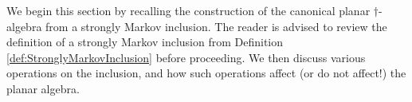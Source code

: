 \documentclass[11pt]{article}
\theoremstyle{plain}
\newtheorem{prop}[thm]{Proposition}
\theoremstyle{definition}
\newtheorem{defn}[thm]{Definition}
\DeclareMathOperator{\tr}{tr}
\newcommand{\dave}[1]{\marginpar{\tiny \textcolor{orange}{DP: #1}}}
\begin{document}
We begin this section by recalling the construction of the canonical planar $\dag$-algebra from a strongly Markov inclusion.
The reader is advised to review the definition of a strongly Markov inclusion from Definition \ref{def:StronglyMarkovInclusion} before proceeding.
We then discuss various operations on the inclusion, and how such operations affect (or do not affect!) the planar algebra.

%
%
%
%
%
\end{document}
